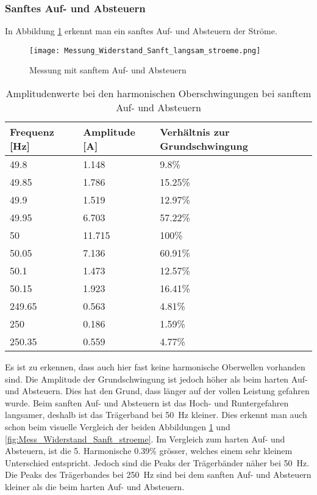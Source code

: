 \newpage
\subsubsection*{Sanftes Auf- und Absteuern}\label{sec:Sanft_Widerstand_stroeme}
In Abbildung \ref{fig:Mess_Widerstand_Sanft_langsam_stroeme} erkennt man ein sanftes Auf- und Absteuern der Ströme.

\begin{figure}[ht!]
	\centering
	\texttt{[image: Messung\_Widerstand\_Sanft\_langsam\_stroeme.png]}	
	\caption{Messung mit sanftem Auf- und Absteuern}\label{fig:Mess_Widerstand_Sanft_langsam_stroeme}
\end{figure}

\begin{table}[ht!]
	\centering
	\begin{tabular}{|l|l|l|}
		\hline
		Frequenz {[}Hz{]} & Amplitude {[}A{]} & Verhältnis zur Grundschwingung	\\ \hline
		49.8              & 1.148             & 9.8\%							\\ \hline
		49.85             & 1.786             & 15.25\%							\\ \hline
		49.9              & 1.519             & 12.97\%							\\ \hline
		49.95             & 6.703             & 57.22\%							\\ \hline
		50                & 11.715            & 100\%							\\ \hline
		50.05             & 7.136             & 60.91\%							\\ \hline
		50.1              & 1.473             & 12.57\%							\\ \hline
		50.15             & 1.923             & 16.41\%							\\ \hline
		249.65            & 0.563             & 4.81\%							\\ \hline
		250               & 0.186             & 1.59\%							\\ \hline
		250.35            & 0.559             & 4.77\%							\\ \hline
	\end{tabular}
	\caption{Amplitudenwerte bei den harmonischen Oberschwingungen bei sanftem Auf- und Absteuern}\label{tab:Sanft_langsam_stroeme}
\end{table}
Es ist zu erkennen, dass auch hier fast keine harmonische Oberwellen vorhanden sind. Die Amplitude der Grundschwingung ist jedoch höher als beim harten Auf- und Absteuern. Dies hat den Grund, dass länger auf der vollen Leistung gefahren wurde. Beim sanften Auf- und Absteuern ist das Hoch- und Runtergefahren langsamer, deshalb ist das Trägerband bei \SI{50}{Hz} kleiner. Dies erkennt man auch schon beim visuelle Vergleich der beiden Abbildungen \ref{fig:Mess_Widerstand_Sanft_langsam_stroeme} und \ref{fig:Mess_Widerstand_Sanft_stroeme}. Im Vergleich zum harten Auf- und Absteuern, ist die 5. Harmonische 0.39\% grösser, welches einem sehr kleinem Unterschied entspricht. Jedoch sind die Peaks der Trägerbänder näher bei \SI{50}{Hz}. Die Peaks des Trägerbandes bei \SI{250}{Hz} sind bei dem sanften Auf- und Absteuern kleiner als die beim harten Auf- und Absteuern.




